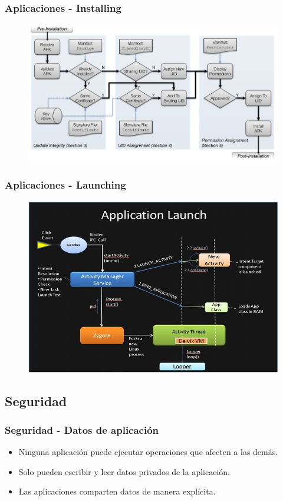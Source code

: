 \begin{frame}
  \frametitle{Aplicaciones - Installing}
  \begin{figure}
    \centering
    \includegraphics[scale=0.3]{images/install-app.png}
  \end{figure} 
\end{frame}

\begin{frame}
  \frametitle{Aplicaciones - Launching}
    \begin{figure}
      \centering
      \includegraphics[scale=0.5]{images/launch-app.jpg}
    \end{figure}
\end{frame}

\subsection{Seguridad}
\begin{frame}
  \frametitle{Seguridad - Datos de aplicación}
  \begin{itemize}
    \item Ninguna aplicación puede ejecutar operaciones que afecten a las demás.
    
    \item Solo pueden escribir y leer datos privados de la aplicación.
    
    \item Las aplicaciones comparten datos de manera explícita.    
  \end{itemize}
\end{frame}

